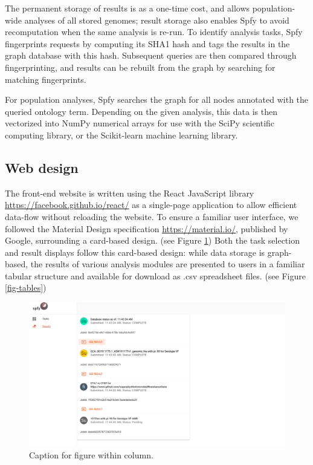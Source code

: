 \documentclass[a4,center,fleqn]{NAR}
\begin{document}
The permanent storage of results is as a one-time cost, and allows population-wide analyses of all stored genomes; result storage also enables Spfy to avoid recomputation when the same analysis is re-run. To identify analysis tasks, Spfy fingerprints requests by computing its SHA1 hash and tags the results in the graph database with this hash. Subsequent queries are then compared through fingerprinting, and results can be rebuilt from the graph by searching for matching fingerprints.

For population analyses, Spfy searches the graph for all nodes annotated with the queried ontology term. Depending on the given analysis, this data is then vectorized into NumPy numerical arrays for use with the SciPy scientific computing library, or the Scikit-learn machine learning library.

\subsection{Web design}

The front-end website is written using the React JavaScript library \url{https://facebook.github.io/react/} as a single-page application to allow efficient data-flow without reloading the website.
To ensure a familiar user interface, we followed the Material Design specification \url{https://material.io/}, published by Google, surrounding a card-based design.
(see Figure \ref{fig-results})
Both the task selection and result displays follow this card-based design: while data storage is graph-based, the results of various analysis modules are presented to users in a familiar tabular structure and available for download as .csv spreadsheet files.
(see Figure \ref{fig-tables})

\begin{figure}[t]
\begin{center}
\includegraphics{images/results.png}
\end{center}
\caption{Caption for figure within column.}
\label{fig-results}
\end{figure}
\end{document}

